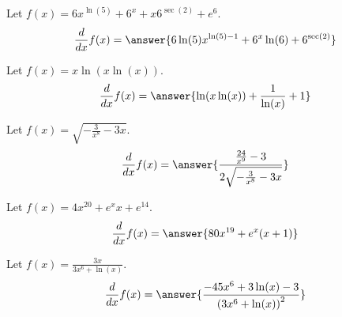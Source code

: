 \documentclass{ximera}
\begin{document}
\begin{shuffle}
\begin{exercise}
Let $f(x)=6 x^{\ln (5)}+6^x+x 6^{\sec (2)}+e^6$.
\[
\ddx f(x) = \answer{6 \ln (5) x^{\ln (5)-1}+6^x \ln (6)+6^{\sec (2)}}
\]
\end{exercise}



\begin{exercise}
Let $f(x)=x \ln (x \ln (x))$.
\[
\ddx f(x) = \answer{\ln (x \ln (x))+\frac{1}{\ln (x)}+1}
\]
\end{exercise}

\begin{exercise}
Let $f(x)=\sqrt{-\frac{3}{x^8}-3 x}$.
\[
\ddx f(x) = \answer{\frac{\frac{24}{x^9}-3}{2 \sqrt{-\frac{3}{x^8}-3 x}}}
\]
\end{exercise}

\begin{exercise}
Let $f(x)=4 x^{20}+e^x x+e^{14}$.
\[
\ddx f(x) = \answer{80 x^{19}+e^x (x+1)}
\]
\end{exercise}



\begin{exercise}
Let $f(x)=\frac{3 x}{3 x^6+\ln (x)}$.
\[
\ddx f(x) = \answer{\frac{-45 x^6+3 \ln (x)-3}{\left(3 x^6+\ln (x)\right)^2}}
\]
\end{exercise}


\end{shuffle}
\end{document}

